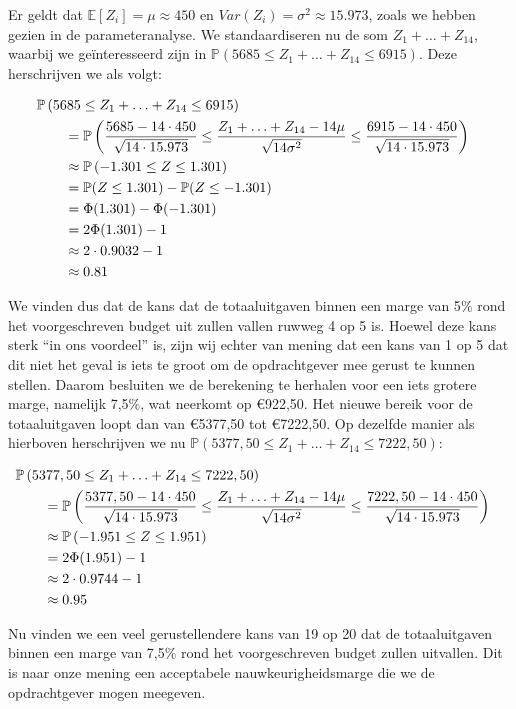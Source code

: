 Er geldt dat $\mathbb{E}[Z_{i}] = \mu \approx 450$ en $Var(Z_{i}) = \sigma^{2}\approx 15.973$, zoals we hebben gezien in de parameteranalyse. We standaardiseren nu de som $Z_{1} + \ldots + Z_{14}$, waarbij we ge\"interesseerd zijn in $\mathbb{P}(5685 \leq Z_{1} + \ldots + Z_{14} \leq 6915)$. Deze herschrijven we als volgt:

\begin{eqnarray*}
\begin{aligned}
\lefteqn{\mathbb{P}\left(5685 \leq Z_{1} + \ldots + Z_{14} \leq 6915  \right)}\\ 
& \qquad{}= \mathbb{P}\left(\frac{5685 - 14 \cdot 450}{\sqrt{14 \cdot 15.973}} \leq \frac{Z_{1} + \ldots + Z_{14} - 14\mu }{\sqrt{14\sigma^{2}}} \leq \frac{6915 - 14 \cdot 450}{\sqrt{14 \cdot 15.973}}\right)\\
& \qquad{}\approx \mathbb{P}\left(-1.301 \leq Z \leq 1.301 \right)\\
&\qquad{}= \mathbb{P}(Z \leq 1.301) - \mathbb{P}(Z \leq -1.301)\\
&\qquad{}= \Phi(1.301)-\Phi(-1.301)\\
&\qquad{}= 2\Phi(1.301)-1\\
&\qquad{}\approx 2 \cdot 0.9032 - 1 \\
& \qquad{} \approx 0.81
\end{aligned}
\end{eqnarray*}

We vinden dus dat de kans dat de totaaluitgaven binnen een marge van 5$\%$ rond het voorgeschreven budget uit zullen vallen ruwweg 4 op 5 is. Hoewel deze kans sterk ``in ons voordeel'' is, zijn wij echter van mening dat een kans van 1 op 5 dat dit niet het geval is iets te groot om de opdrachtgever mee gerust te kunnen stellen. Daarom besluiten we de berekening te herhalen voor een iets grotere marge, namelijk 7,5$\%$, wat neerkomt op \euro922,50. Het nieuwe bereik voor de totaaluitgaven loopt dan van \euro5377,50 tot \euro7222,50. Op dezelfde manier als hierboven herschrijven we nu $\mathbb{P}(5377,50 \leq Z_{1} + \ldots + Z_{14} \leq 7222,50)$:

\begin{eqnarray*}
\begin{aligned}
\lefteqn{\mathbb{P}\left(5377,50 \leq Z_{1} + \ldots + Z_{14} \leq 7222,50  \right)}\\ 
& \qquad{}= \mathbb{P}\left(\frac{5377,50 - 14 \cdot 450}{\sqrt{14 \cdot 15.973}} \leq \frac{Z_{1} + \ldots + Z_{14} - 14\mu }{\sqrt{14\sigma^{2}}} \leq \frac{7222,50 - 14 \cdot 450}{\sqrt{14 \cdot 15.973}}\right)\\
& \qquad{}\approx \mathbb{P}\left(-1.951 \leq Z \leq 1.951 \right)\\
&\qquad{}= 2\Phi(1.951)-1\\
&\qquad{}\approx 2 \cdot 0.9744 - 1 \\
& \qquad{} \approx 0.95
\end{aligned}
\end{eqnarray*}

Nu vinden we een veel gerustellendere kans van 19 op 20 dat de totaaluitgaven binnen een marge van 7,5$\%$ rond het voorgeschreven budget zullen uitvallen. Dit is naar onze mening een acceptabele nauwkeurigheidsmarge die we de opdrachtgever mogen meegeven.